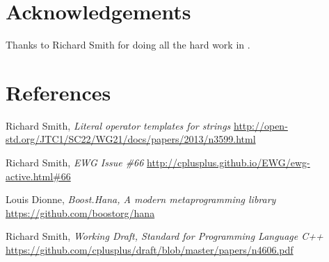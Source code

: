 \documentclass[11pt]{article}
\begin{document}
\section{Acknowledgements}
Thanks to Richard Smith for doing all the hard work in \cite{N3599}.


\section{References}
\renewcommand{\section}[2]{}%
\begin{thebibliography}{9}

    Richard Smith,
    \emph{Literal operator templates for strings}\newline
    \url{http://open-std.org/JTC1/SC22/WG21/docs/papers/2013/n3599.html}

    Richard Smith,
    \emph{EWG Issue \#66}\newline
    \url{http://cplusplus.github.io/EWG/ewg-active.html#66}

    Louis Dionne,
    \emph{Boost.Hana, A modern metaprogramming library}\newline
    \url{https://github.com/boostorg/hana}

    Richard Smith,
    \emph{Working Draft, Standard for Programming Language C++}\newline
    \url{https://github.com/cplusplus/draft/blob/master/papers/n4606.pdf}

\end{thebibliography}
\end{document}
